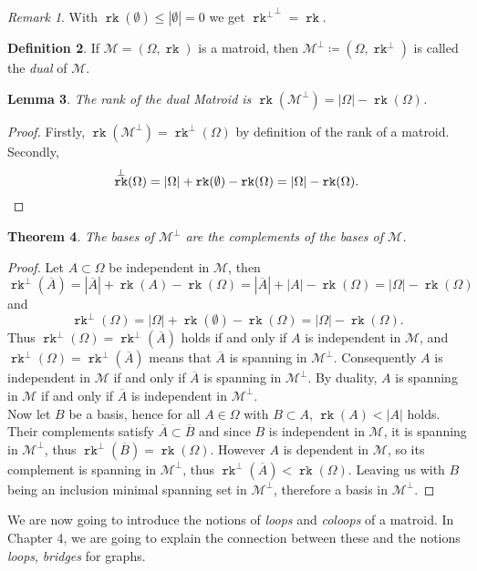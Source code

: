 \documentclass[12pt,a4paper, twoside, autooneside=false]{scrartcl}
\newtheorem{theorem}{Theorem}[section]
\newtheorem{lemma}[theorem]{Lemma}
\theoremstyle{definition}
\newtheorem{definition}[theorem]{Definition}
\theoremstyle{remark}
\newtheorem{remark}[theorem]{Remark}
\numberwithin{equation}{section}
\DeclareMathOperator{\rk}{\mathtt{rk}}
\newcommand{\M}{\mathcal{M}} %
\begin{document}
\begin{remark}
With $\rk(\emptyset) \leq |\emptyset| = 0$ we get ${\rk^\perp}^\perp = \rk$. 
\end{remark}
\begin{definition}
If $\M = (\Omega, \rk)$ is a matroid, then $\M^\perp \coloneqq (\Omega, \rk^\perp)$ is called the \textit{dual} of $\M$. 
\end{definition}
\begin{lemma}
The rank of the dual Matroid is $\rk(\M^\perp) = |\Omega| - \rk(\Omega)$. 
\end{lemma}
\begin{proof}
Firstly, $\rk(\M^\perp) = \rk^\perp(\Omega)$ by definition of the rank of a matroid. Secondly, \[ \rk^\perp(\Omega) = |\Omega| + \rk(\emptyset) - \rk(\Omega) = |\Omega| - \rk(\Omega). \qedhere \] 
\end{proof}
\begin{theorem}
The bases of $\M^\perp$ are the complements of the bases of $\M$. 
\end{theorem}
\begin{proof}
Let $A \subset \Omega$ be independent in $\M$, then 
\[
\rk^\perp(\overline{A}) = |\overline{A}| + \rk(A) - \rk(\Omega) = |\overline{A}| + |A| - \rk(\Omega) = |\Omega| - \rk(\Omega)
\]
and 
\[
\rk^\perp(\Omega) = |\Omega| + \rk(\emptyset) - \rk(\Omega) = |\Omega| - \rk(\Omega).  
\]
Thus $\rk^\perp(\Omega) = \rk^\perp(\overline{A})$ holds if and only if $A$ is independent in $\M$, and $\rk^\perp(\Omega) = \rk^\perp(\overline{A})$ means that $\overline{A}$ is spanning in $\M^\perp$. Consequently $A$ is independent in $\M$ if and only if $\overline{A}$ is spanning in $\M^\perp$. By duality, $A$ is spanning in $\M$ if and only if $\overline{A}$ is independent in $\M^\perp$. \\ 
\indent Now let $B$ be a basis, hence for all $A \in \Omega$ with $B \subset A$, $\rk(A) < |A|$ holds. Their complements satisfy $\overline{A} \subset \overline{B}$ and since $B$ is independent in $\M$, it is spanning in $\M^\perp$, thus $\rk^\perp(\overline{B}) = \rk(\Omega)$. However $A$ is dependent in $\M$, so its complement is spanning in $\M^\perp$, thus $\rk^\perp(\overline{A}) < \rk(\Omega)$. Leaving us with $B$ being an inclusion minimal spanning set in $\M^\perp$, therefore a basis in $\M^\perp$. 
\end{proof}
We are now going to introduce the notions of \textit{loops} and \textit{coloops} of a matroid. In Chapter 4, we are going to explain the connection between these and the notions \textit{loops}, \textit{bridges} for graphs.
\end{document}
